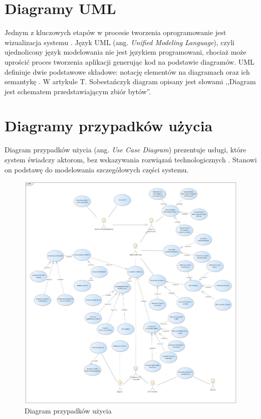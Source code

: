 \section{Diagramy UML}
Jednym z kluczowych etapów w procesie tworzenia oprogramowanie jest wizualizacja systemu \cite{UML}. Język UML (ang. \textit{Unified Modeling Language}), czyli ujednolicony język modelowania nie jest językiem programowani, chociaż może uprościć proces tworzenia aplikacji generując kod na podstawie diagramów. UML definiuje dwie podstawowe składowe: notację elementów na diagramach oraz ich semantykę \cite{UML1}. W artykule T. Sobestańczyk diagram opisany jest słowami ,,Diagram jest schematem przedstawiającym zbiór bytów''.
\section{Diagramy przypadków użycia}
Diagram przypadków użycia (ang. \textit{Use Case Diagram}) prezentuje usługi, które system świadczy aktorom, bez wskazywania rozwiązań technologicznych \cite{UML1}. Stanowi on podstawę do modelowania szczegółowych części systemu.
\begin{figure}[H]
	\centering
	\includegraphics[width=1\textwidth]{images/DPU.jpg}
	\caption{Diagram przypadków użycia}
	\label{fig:UseCase}
\end{figure}
